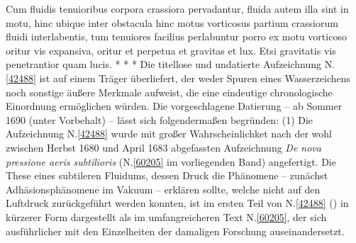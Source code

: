 \pend%
\pstart%
Cum fluidis tenuioribus corpora crassiora pervadantur,%
%
fluida autem illa sint in motu,%
hinc ubique
inter obstacula%
hinc motus vorticosus partium crassiorum fluidi interlabentis,%
%
%
tum tenuiores%
facilius perlabuntur%
%
\bracks{;}
porro ex motu vorticoso%
oritur vis expansiva,%
oritur et perpetua
%
et
gravitas%
et lux.%
Etsi gravitatis vis%
penetrantior
quam lucis.%
\pend%
\vspace{3.0em}%
\pstart%
\noindent%
\centering%
*     *     *
\pend%
\newpage%
%
\frenchspacing%
\footnotesize%
\pstart%
\noindent%
%
Die titellose und undatierte Aufzeichnung N.\;\ref{42488} ist auf einem Träger überliefert, der weder Spuren eines Wasserzeichens noch sonstige äußere Merkmale aufweist, die eine eindeutige chronologische Einordnung ermöglichen würden. %
Die vorgeschlagene Datierung -- ab Sommer 1690 (unter Vorbehalt) -- lässt sich folgendermaßen begründen:
\pend%
\pstart%
(1)
Die Aufzeichnung N.\;\ref{42488} wurde mit großer Wahrscheinlichket nach der wohl zwischen Herbst 1680 und April 1683 abgefassten Aufzeichnung \textit{De nova pressione aeris subtilioris} (N.\;\ref{60205} im vorliegenden Band) angefertigt.
Die These eines subtileren Fluidums, dessen Druck die Phänomene -- zunächst Adhäsionsphänomene im Vakuum -- erklären sollte, welche nicht auf den Luftdruck zurückgeführt werden konnten, ist im ersten Teil von N.\;\ref{42488} () in kürzerer Form dargestellt als im umfangreicheren Text N.\;\ref{60205}, der sich ausführlicher mit den Einzelheiten der damaligen Forschung auseinandersetzt.
